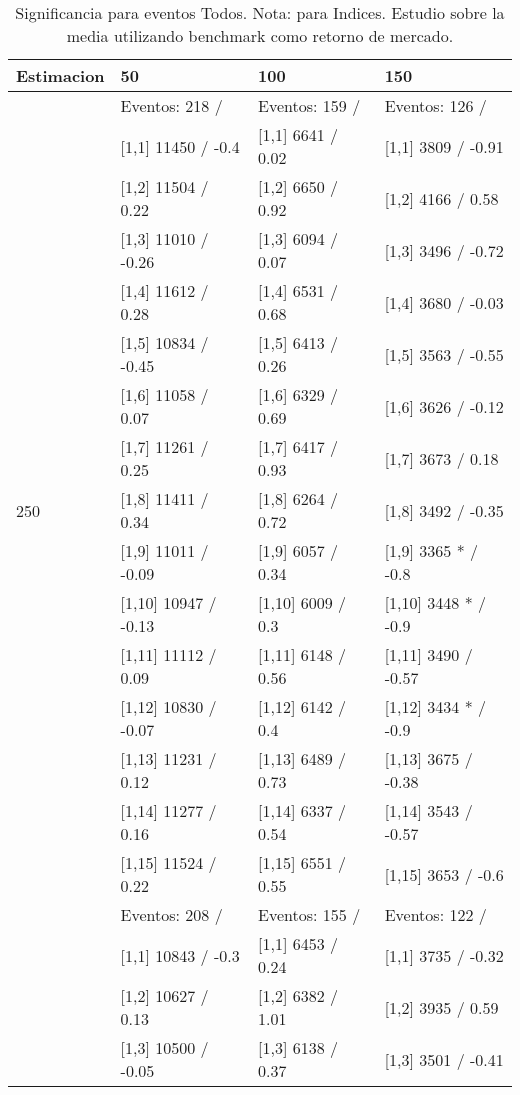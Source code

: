 \begin{table}

\caption{Significancia para eventos Todos. Nota: para Indices. Estudio sobre la media utilizando benchmark como retorno de mercado.}
\centering
\begin{tabular}[t]{llll}
\toprule
Estimacion & 50 & 100 & 150\\
\midrule
 & Eventos:  218 / & Eventos:  159 / & Eventos:  126 /\\
 & {}[1,1] 11450  / -0.4 & {}[1,1] 6641  / 0.02 & {}[1,1] 3809  / -0.91\\
 & {}[1,2] 11504  / 0.22 & {}[1,2] 6650  / 0.92 & {}[1,2] 4166  / 0.58\\
 & {}[1,3] 11010  / -0.26 & {}[1,3] 6094  / 0.07 & {}[1,3] 3496  / -0.72\\
 & {}[1,4] 11612  / 0.28 & {}[1,4] 6531  / 0.68 & {}[1,4] 3680  / -0.03\\
\addlinespace
 & {}[1,5] 10834  / -0.45 & {}[1,5] 6413  / 0.26 & {}[1,5] 3563  / -0.55\\
 & {}[1,6] 11058  / 0.07 & {}[1,6] 6329  / 0.69 & {}[1,6] 3626  / -0.12\\
 & {}[1,7] 11261  / 0.25 & {}[1,7] 6417  / 0.93 & {}[1,7] 3673  / 0.18\\
250 & {}[1,8] 11411  / 0.34 & {}[1,8] 6264  / 0.72 & {}[1,8] 3492  / -0.35\\
 & {}[1,9] 11011  / -0.09 & {}[1,9] 6057  / 0.34 & {}[1,9] 3365 * / -0.8\\
\addlinespace
 & {}[1,10] 10947  / -0.13 & {}[1,10] 6009  / 0.3 & {}[1,10] 3448 * / -0.9\\
 & {}[1,11] 11112  / 0.09 & {}[1,11] 6148  / 0.56 & {}[1,11] 3490  / -0.57\\
 & {}[1,12] 10830  / -0.07 & {}[1,12] 6142  / 0.4 & {}[1,12] 3434 * / -0.9\\
 & {}[1,13] 11231  / 0.12 & {}[1,13] 6489  / 0.73 & {}[1,13] 3675  / -0.38\\
 & {}[1,14] 11277  / 0.16 & {}[1,14] 6337  / 0.54 & {}[1,14] 3543  / -0.57\\
\addlinespace
 & {}[1,15] 11524  / 0.22 & {}[1,15] 6551  / 0.55 & {}[1,15] 3653  / -0.6\\
 & Eventos:  208 / & Eventos:  155 / & Eventos:  122 /\\
 & {}[1,1] 10843  / -0.3 & {}[1,1] 6453  / 0.24 & {}[1,1] 3735  / -0.32\\
 & {}[1,2] 10627  / 0.13 & {}[1,2] 6382  / 1.01 & {}[1,2] 3935  / 0.59\\
 & {}[1,3] 10500  / -0.05 & {}[1,3] 6138  / 0.37 & {}[1,3] 3501  / -0.41\\

\end{tabular}
\end{table}
